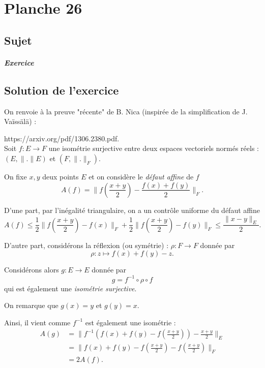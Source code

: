 \chapter{Planche 26}

\section{Sujet}

\paragraph{Exercice}

\section{Solution de l'exercice}

On renvoie à la preuve "récente" de B. Nica (inspirée de la simplification de J. Vaïssälä) :

https://arxiv.org/pdf/1306.2380.pdf.\\

Soit $f : E \rightarrow F$ une isométrie surjective entre deux espaces vectoriels normés réels : $(E,\|.\|{E})$ et $(F,\|.\|_{F}).$

On fixe $x,y$ deux points $E$ et on considère le \emph{défaut affine} de $f$ $$A(f)=\|f(\frac{x+y}{2})-\frac{f(x)+f(y)}{2}\|_{F}.$$

D'une part, par l'inégalité triangulaire, on a un contrôle uniforme du défaut affine $$A(f)\leq \frac{1}{2}\|f(\frac{x+y}{2})-f(x)\|_{F}+\frac{1}{2}\|f(\frac{x+y}{2})-f(y)\|_{F}\leq \frac{\|x-y\|_{E}}{2}.$$

D'autre part, considérons la réflexion (ou symétrie) : $\rho : F \rightarrow F$ donnée par $$\rho : z \mapsto f(x)+f(y)-z.$$

Considérons alors $g : E \rightarrow E$ donnée par $$g=f^{-1}\circ \rho\circ f$$ qui est également une \emph{isométrie surjective}. 

On remarque que $g(x)=y$ et $g(y)=x.$

Ainsi, il vient comme $f^{-1}$ est également une isométrie : 
\begin{align*}
A(g) & = \|f^{-1}\left( f(x)+f(y)-f(\frac{x+y}{2})\right)-\frac{x+y}{2}\|_{E}\\
& = \|f(x)+f(y)-f(\frac{x+y}{2})-f(\frac{x+y}{2})\|_{F}\\
& = 2A(f).
\end{align*}

